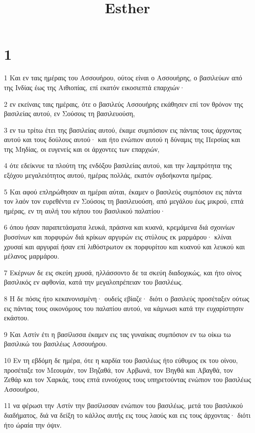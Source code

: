 

\title{Esther}


\chapter{1}

\par 1 Και εν ταις ημέραις του Ασσουήρου, ούτος είναι ο Ασσουήρης, ο βασιλεύων από της Ινδίας έως της Αιθιοπίας, επί εκατόν εικοσιεπτά επαρχιών·
\par 2 εν εκείναις ταις ημέραις, ότε ο βασιλεύς Ασσουήρης εκάθησεν επί τον θρόνον της βασιλείας αυτού, εν Σούσοις τη βασιλευούση,
\par 3 εν τω τρίτω έτει της βασιλείας αυτού, έκαμε συμπόσιον εις πάντας τους άρχοντας αυτού και τους δούλους αυτού· και ήτο ενώπιον αυτού η δύναμις της Περσίας και της Μηδίας, οι ευγενείς και οι άρχοντες των επαρχιών,
\par 4 ότε εδείκνυε τα πλούτη της ενδόξου βασιλείας αυτού, και την λαμπρότητα της εξόχου μεγαλειότητος αυτού, ημέρας πολλάς, εκατόν ογδοήκοντα ημέρας.
\par 5 Και αφού επληρώθησαν αι ημέραι αύται, έκαμεν ο βασιλεύς συμπόσιον εις πάντα τον λαόν τον ευρεθέντα εν Σούσοις τη βασιλευούση, από μεγάλου έως μικρού, επτά ημέρας, εν τη αυλή του κήπου του βασιλικού παλατίου·
\par 6 όπου ήσαν παραπετάσματα λευκά, πράσινα και κυανά, κρεμάμενα διά σχοινίων βυσσίνων και πορφυρών διά κρίκων αργυρών εις στύλους εκ μαρμάρου· κλίναι χρυσαί και αργυραί ήσαν επί λιθόστρωτον εκ πορφυρίτου και κυανού και λευκού και μέλανος μαρμάρου.
\par 7 Εκέρνων δε εις σκεύη χρυσά, ηλλάσσοντο δε τα σκεύη διαδοχικώς, και ήτο οίνος βασιλικός εν αφθονία, κατά την μεγαλοπρέπειαν του βασιλέως.
\par 8 Η δε πόσις ήτο κεκανονισμένη· ουδείς εβίαζε· διότι ο βασιλεύς προσέταξεν ούτως εις πάντας τους οικονόμους του παλατίου αυτού, να κάμνωσι κατά την ευχαρίστησιν εκάστου.
\par 9 Και Αστίν έτι η βασίλισσα έκαμεν εις τας γυναίκας συμπόσιον εν τω οίκω τω βασιλικώ του βασιλέως Ασσουήρου.
\par 10 Εν τη εβδόμη δε ημέρα, ότε η καρδία του βασιλέως ήτο εύθυμος εκ του οίνου, προσέταξε τον Μεουμάν, τον Βηζαθά, τον Αρβωνά, τον Βηγθά και Αβαγθά, τον Ζεθάρ και τον Χαρκάς, τους επτά ευνούχους τους υπηρετούντας ενώπιον του βασιλέως Ασσουήρου,
\par 11 να φέρωσι την Αστίν την βασίλισσαν ενώπιον του βασιλέως, μετά του βασιλικού διαδήματος, διά να δείξη το κάλλος αυτής εις τους λαούς και εις τους άρχοντας· διότι ήτο ώραία την όψιν.

